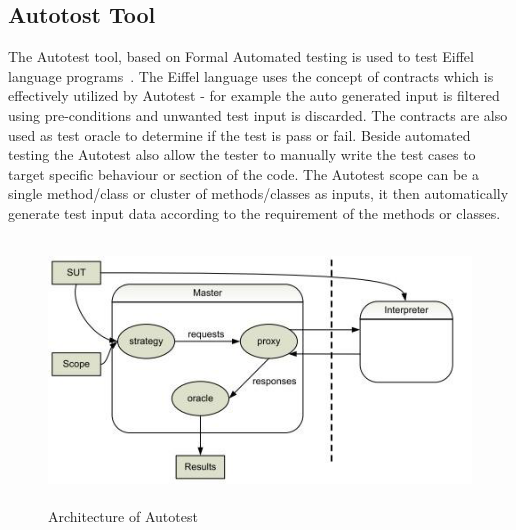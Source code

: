 \subsection{Autotost Tool}
The Autotest tool, based on Formal Automated testing is used to test Eiffel language programs~\cite{Ciupa2007}. The Eiffel language uses the concept of contracts which is effectively utilized by Autotest - for example the auto generated input is filtered using pre-conditions and unwanted test input is discarded. The contracts are also used as test oracle to determine if the test is pass or fail. Beside automated testing the Autotest also allow the tester to manually write the test cases to target specific behaviour or section of the code. The Autotest scope can be a single method/class or cluster of methods/classes as inputs, it then automatically generate test input data according to the requirement of the methods or classes.

\begin{figure}[h]
	\centering
	\includegraphics[width=13cm, height=7cm]{chapter3/autotest.png}
	\caption{Architecture of Autotest}
	\label{fig:autotest}
\end{figure}

